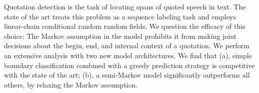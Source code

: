 Quotation detection is the task of locating spans of quoted speech in text.  The state of the art treats this problem as a sequence labeling task and employs linear-chain conditional random random fields.  We question the efficacy of this choice: The Markov assumption in the model prohibits it from making joint decisions about the begin, end, and internal context of a quotation. We perform an extensive analysis with two new model architectures. We find that (a), simple boundary classification combined with a greedy prediction strategy is competitive with the state of the art; (b), a semi-Markov model significantly outperforms all others, by relaxing the Markov assumption.
